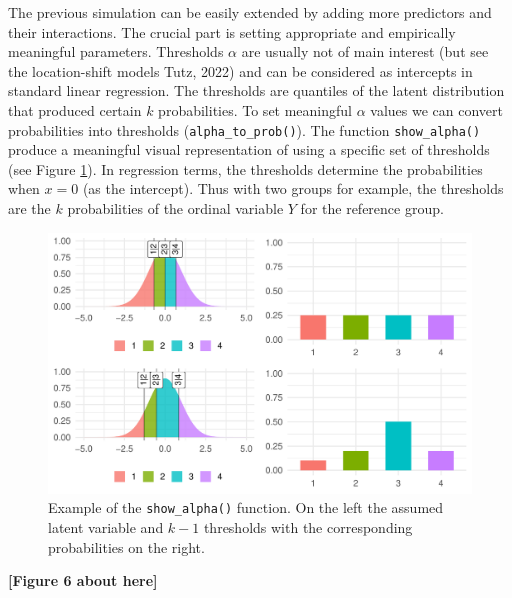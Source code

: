 \documentclass[
  man, mask,floatsintext]{apa6}
\begin{document}
The previous simulation can be easily extended by adding more predictors and their interactions. The crucial part is setting appropriate and empirically meaningful parameters. Thresholds \(\alpha\) are usually not of main interest (but see the location-shift models Tutz, 2022) and can be considered as intercepts in standard linear regression. The thresholds are quantiles of the latent distribution that produced certain \(k\) probabilities. To set meaningful \(\alpha\) values we can convert probabilities into thresholds (\texttt{alpha\_to\_prob()}). The function \texttt{show\_alpha()} produce a meaningful visual representation of using a specific set of thresholds (see Figure \ref{fig:fig-show-th-example}). In regression terms, the thresholds determine the probabilities when \(x = 0\) (as the intercept). Thus with two groups for example, the thresholds are the \(k\) probabilities of the ordinal variable \(Y\) for the reference group.

\scriptsize

\begin{figure}

{\centering \includegraphics[width=1\linewidth]{paper_files/figure-latex/fig-show-th-example-1} 

}

\caption{Example of the \texttt{show\_alpha()} function. On the left the assumed latent variable and \(k - 1\) thresholds with the corresponding probabilities on the right.}\label{fig:fig-show-th-example}
\end{figure}

\begin{center}\textbf{[Figure 6 about here]} \end{center}

\normalsize
\end{document}
